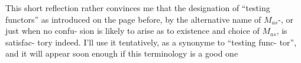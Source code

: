 This short reflection rather convinces me that the designation of
``testing functors'' as introduced on the page before, by the alternative
name of $M_{as}$-\hand{\uline{\textcolor{black}{aspheric functors}}}, or just \hand{\uline{\textcolor{black}{aspheric functors}}} when no confu-%
sion is likely to arise as to existence and choice of $M_{as}$, is satisfac-%
tory indeed. I'll use it tentatively, as a synonyme to ``testing func-%
tor'', and it will appear soon enough if this terminology is a good one
